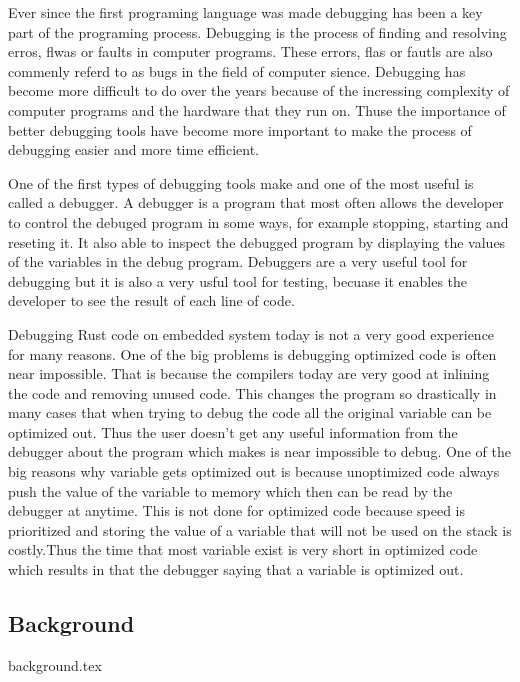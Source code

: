 
Ever since the first programing language was made debugging has been a key part of the programing process.
Debugging is the process of finding and resolving erros, flwas or faults in computer programs.
These errors, flas or fautls are also commenly referd to as bugs in the field of computer sience.
Debugging has become more difficult to do over the years because of the incressing complexity of computer programs and the hardware that they run on.
Thuse the importance of better debugging tools have become more important to make the process of debugging easier and more time efficient.


One of the first types of debugging tools make and one of the most useful is called a debugger.
A debugger is a program that most often allows the developer to control the debuged program in some ways, for example stopping, starting and reseting it.
It also able to inspect the debugged program by displaying the values of the variables in the debug program.
Debuggers are a very useful tool for debugging but it is also a very usful tool for testing, becuase it enables the developer to see the result of each line of code.






Debugging Rust code on embedded system today is not a very good experience for many reasons.
One of the big problems is debugging optimized code is often near impossible.
That is because the compilers today are very good at inlining the code and removing unused code.
This changes the program so drastically in many cases that when trying to debug the code all the original variable can be optimized out.
Thus the user doesn't get any useful information from the debugger about the program which makes is near impossible to debug.
One of the big reasons why variable gets optimized out is because unoptimized code always push the value of the variable to memory which then can be read by the debugger at anytime.
This is not done for optimized code because speed is prioritized and storing the value of a variable that will not be used on the stack is costly.Thus the time that most variable exist is very short in optimized code which results in that the debugger saying that a variable is optimized out.

\subsection{Background}
{background.tex}

